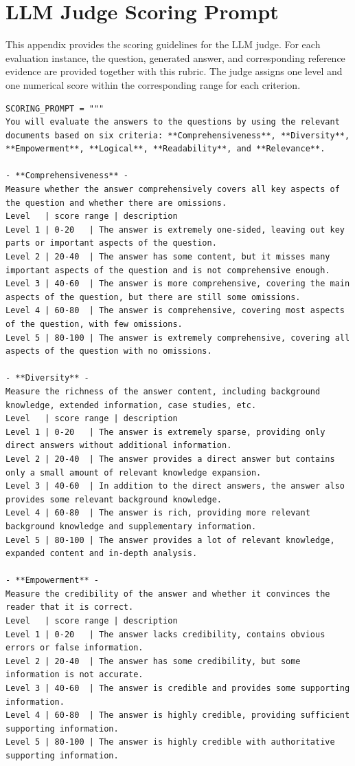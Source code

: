 \documentclass{article} %
\begin{document}
\section{LLM Judge Scoring Prompt}
\label{app:llm_judge_scoring_prompt}

This appendix provides the scoring guidelines for the LLM judge. For each evaluation instance, the question, generated answer, and corresponding reference evidence are provided together with this rubric. The judge assigns one level and one numerical score within the corresponding range for each criterion.

\begin{lstlisting}
SCORING_PROMPT = """
You will evaluate the answers to the questions by using the relevant documents based on six criteria: **Comprehensiveness**, **Diversity**, **Empowerment**, **Logical**, **Readability**, and **Relevance**.

- **Comprehensiveness** -
Measure whether the answer comprehensively covers all key aspects of the question and whether there are omissions.
Level   | score range | description
Level 1 | 0-20   | The answer is extremely one-sided, leaving out key parts or important aspects of the question.
Level 2 | 20-40  | The answer has some content, but it misses many important aspects of the question and is not comprehensive enough.
Level 3 | 40-60  | The answer is more comprehensive, covering the main aspects of the question, but there are still some omissions.
Level 4 | 60-80  | The answer is comprehensive, covering most aspects of the question, with few omissions.
Level 5 | 80-100 | The answer is extremely comprehensive, covering all aspects of the question with no omissions.

- **Diversity** -
Measure the richness of the answer content, including background knowledge, extended information, case studies, etc.
Level   | score range | description
Level 1 | 0-20   | The answer is extremely sparse, providing only direct answers without additional information.
Level 2 | 20-40  | The answer provides a direct answer but contains only a small amount of relevant knowledge expansion.
Level 3 | 40-60  | In addition to the direct answers, the answer also provides some relevant background knowledge.
Level 4 | 60-80  | The answer is rich, providing more relevant background knowledge and supplementary information.
Level 5 | 80-100 | The answer provides a lot of relevant knowledge, expanded content and in-depth analysis.

- **Empowerment** -
Measure the credibility of the answer and whether it convinces the reader that it is correct.
Level   | score range | description
Level 1 | 0-20   | The answer lacks credibility, contains obvious errors or false information.
Level 2 | 20-40  | The answer has some credibility, but some information is not accurate.
Level 3 | 40-60  | The answer is credible and provides some supporting information.
Level 4 | 60-80  | The answer is highly credible, providing sufficient supporting information.
Level 5 | 80-100 | The answer is highly credible with authoritative supporting information.


\end{lstlisting}
\end{document}
